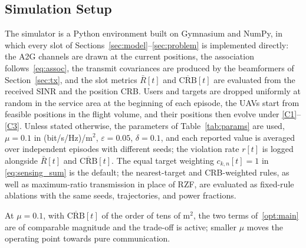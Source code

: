 \documentclass[conference]{IEEEtran}
\begin{document}
\subsection{Simulation Setup}
The simulator is a Python environment built on Gymnasium and NumPy, in which every slot of Sections~\ref{sec:model}--\ref{sec:problem} is implemented directly: the A2G channels are drawn at the current positions, the association follows~\eqref{eq:assoc}, the transmit covariances are produced by the beamformers of Section~\ref{sec:tx}, and the slot metrics $\bar R[t]$ and $\overline{\mathrm{CRB}}[t]$ are evaluated from the received SINR and the position CRB. Users and targets are dropped uniformly at random in the service area at the beginning of each episode, the UAVs start from feasible positions in the flight volume, and their positions then evolve under \eqref{C1}--\eqref{C3}. Unless stated otherwise, the parameters of Table~\ref{tab:params} are used, $\mu=0.1$ in (bit/s/Hz)/m$^2$, $\varepsilon=0.05$, $\delta=0.1$, and each reported value is averaged over independent episodes with different seeds; the violation rate $r[t]$ is logged alongside $\bar R[t]$ and $\overline{\mathrm{CRB}}[t]$. The equal target weighting $c_{k,n}[t]=1$ in \eqref{eq:sensing_sum} is the default; the nearest-target and CRB-weighted rules, as well as maximum-ratio transmission in place of RZF, are evaluated as fixed-rule ablations with the same seeds, trajectories, and power fractions.

At $\mu=0.1$, with $\overline{\mathrm{CRB}}[t]$ of the order of tens of m$^2$, the two terms of~\eqref{opt:main} are of comparable magnitude and the trade-off is active; smaller $\mu$ moves the operating point towards pure communication.
\end{document}
